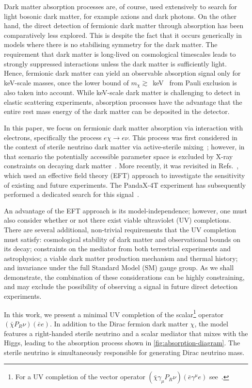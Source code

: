 \documentclass[aps, prd, reprint, nofootinbib, amsmath, amssymb, floatfix]{revtex4-2}
\begin{document}
Dark matter absorption processes are, of course, used extensively to search for light bosonic dark matter, for example axions and dark photons. On the other hand, the direct detection of fermionic dark matter through absorption has been comparatively less explored. This is despite the fact that it occurs generically in models where there is no stabilising symmetry for the dark matter. The requirement that dark matter is long-lived on cosmological timescales leads to strongly suppressed interactions unless the dark matter is sufficiently light. Hence, fermionic dark matter can yield an observable absorption signal only for keV-scale masses, once the lower bound of $m_\chi\gtrsim$~keV~\cite{Alvey:2020xsk,Carena:2021bqm} from Pauli exclusion is also taken into account. While keV-scale dark matter is challenging to detect in elastic scattering experiments, absorption processes have the advantage that the entire rest mass energy of the dark matter can be deposited in the detector. 

In this paper, we focus on fermionic dark matter absorption via interaction with electrons, specifically the process $e\chi \to e \nu$. This process was first considered in the context of sterile neutrino dark matter via active-sterile mixing~\cite{Ando:2010ye}; however, in that scenario the potentially accessible parameter space is excluded by X-ray constraints on decaying dark matter~\cite{Campos:2016gjh}. More recently, it was revisited in Refs.~\cite{Dror:2020czw,Ge:2022ius}, which used an effective field theory (EFT) approach to investigate the sensitivity of existing and future experiments. The PandaX-4T experiment has subsequently performed a dedicated search for this signal~\cite{PandaX:2022ood}.

An advantage of the EFT approach is its model-independence; however, one must also consider whether or not there exist viable ultraviolet (UV) completions. There are several additional, non-trivial requirements that the UV completion must satisfy: cosmological stability of dark matter and observational bounds on its decay; constraints on the mediator from both terrestrial experiments and astrophysics; a viable dark matter production mechanism and thermal history; and invariance under the full Standard Model (SM) gauge group. As we shall demonstrate, the combination of these considerations can be highly constraining, and may exclude the possibility of observing a signal in future direct detection experiments.

In this work, we present a minimal UV completion of the scalar\footnote{For a UV completion of the vector operator $(\bar{\chi}\gamma_\mu P_R\nu) (\bar{e}\gamma^\mu e)$ see~\cite{Dror:2020czw}.} operator $(\bar\chi P_R \nu)(\bar e e)$. In addition to the Dirac fermion dark matter $\chi$, the model features a right-handed sterile neutrino and a scalar mediator that mixes with the Higgs, leading to the absorption process shown in \cref{fig:absorption-diagram}. The sterile neutrino is simultaneously responsible for generating Dirac neutrino mass.
\end{document}
